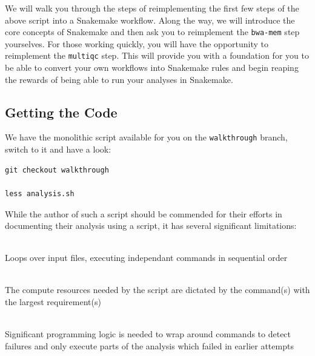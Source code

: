 We will walk you through the steps of reimplementing the first few steps of the above script into a Snakemake workflow. Along the way,
we will introduce the core concepts of Snakemake and then ask you to reimplement the \texttt{bwa-mem} step yourselves. For those
working quickly, you will have the opportunity to reimplement the \texttt{multiqc} step. This will provide you with a foundation
for you to be able to convert your own workflows into Snakemake rules and begin reaping the rewards of being able to run your analyses
in Snakemake.

\subsection{Getting the Code}

We have the monolithic script available for you on the \texttt{walkthrough} branch, switch to it and have a look:

\begin{lstlisting}
git checkout walkthrough

less analysis.sh
\end{lstlisting}

While the author of such a script should be commended for their efforts in documenting their analysis using a script,
it has several significant limitations:

\begin{description}[style=multiline,labelindent=0cm,align=left,leftmargin=0.5cm]
  \item[Not parallelised]\hfill\\
    Loops over input files, executing independant commands in sequential order
  \item[Resources over-specified]\hfill\\
    The compute resources needed by the script are dictated by the command(s) with the largest requirement(s)
  \item[Not idempotent]\hfill\\
    Significant programming logic is needed to wrap around commands to detect failures and only execute parts of the analysis which failed in earlier attempts
\end{description}

